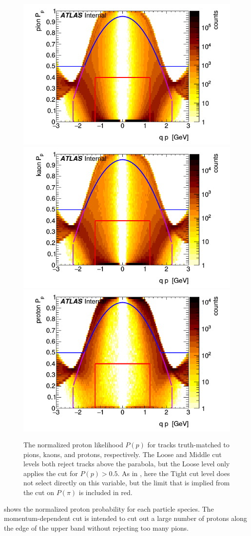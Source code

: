 \begin{figure}[t]
\includegraphics[width=.32\linewidth]{P_pion_p.png}
\includegraphics[width=.32\linewidth]{P_kaon_p.png}
\includegraphics[width=.32\linewidth]{P_proton_p.png}
\caption{The normalized proton likelihood $P(p)$ for tracks truth-matched to pions, kaons, and protons, respectively. The Loose and Middle cut levels both reject tracks above the parabola, but the Loose level only applies the cut for $P(p) > 0.5$. As in , here the Tight cut level does not select directly on this variable, but the limit that is implied from the cut on $P(\pi)$ is included in red.}
\label{fig:prob_p}
\end{figure}

 shows the normalized proton probability for each particle species.
The momentum-dependent cut is intended to cut out a large number of protons along the edge of the upper band without rejecting too many pions.

